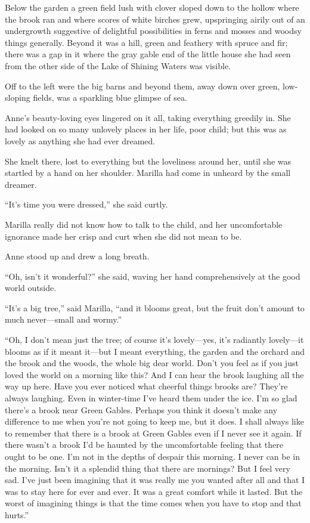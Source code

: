 \documentclass[a4paper]{article}
\begin{document}
Below the garden a green field lush with clover sloped down to the hollow where the brook ran and where scores of white birches grew, upspringing airily out of an undergrowth suggestive of delightful possibilities in ferns and mosses and woodsy things generally. Beyond it was a hill, green and feathery with spruce and fir; there was a gap in it where the gray gable end of the little house she had seen from the other side of the Lake of Shining Waters was visible.

Off to the left were the big barns and beyond them, away down over green, low-sloping fields, was a sparkling blue glimpse of sea.

Anne's beauty-loving eyes lingered on it all, taking everything greedily in. She had looked on so many unlovely places in her life, poor child; but this was as lovely as anything she had ever dreamed.

She knelt there, lost to everything but the loveliness around her, until she was startled by a hand on her shoulder. Marilla had come in unheard by the small dreamer.

``It's time you were dressed,'' she said curtly.

Marilla really did not know how to talk to the child, and her uncomfortable ignorance made her crisp and curt when she did not mean to be.

Anne stood up and drew a long breath.

``Oh, isn't it wonderful?'' she said, waving her hand comprehensively at the good world outside.

``It's a big tree,'' said Marilla, ``and it blooms great, but the fruit don't amount to much never---small and wormy.''

``Oh, I don't mean just the tree; of course it's lovely---yes, it's radiantly lovely---it blooms as if it meant it---but I meant everything, the garden and the orchard and the brook and the woods, the whole big dear world. Don't you feel as if you just loved the world on a morning like this? And I can hear the brook laughing all the way up here. Have you ever noticed what cheerful things brooks are? They're always laughing. Even in winter-time I've heard them under the ice. I'm so glad there's a brook near Green Gables. Perhaps you think it doesn't make any difference to me when you're not going to keep me, but it does. I shall always like to remember that there is a brook at Green Gables even if I never see it again. If there wasn't a brook I'd be haunted by the uncomfortable feeling that there ought to be one. I'm not in the depths of despair this morning. I never can be in the morning. Isn't it a splendid thing that there are mornings? But I feel very sad. I've just been imagining that it was really me you wanted after all and that I was to stay here for ever and ever. It was a great comfort while it lasted. But the worst of imagining things is that the time comes when you have to stop and that hurts.''
\end{document}

